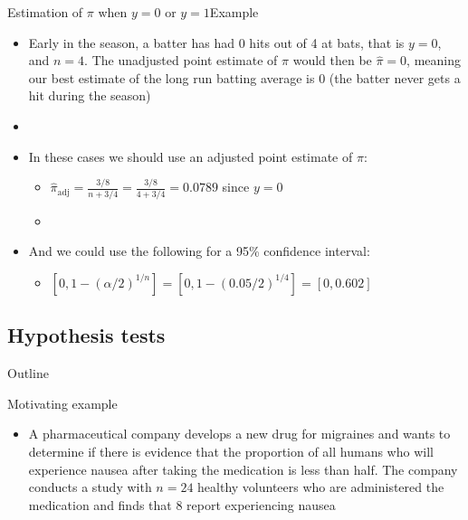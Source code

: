 \documentclass[xcolor=dvipsnames]{beamer}
\begin{document}
\begin{frame}{Estimation of $\pi$ when $y = 0$ or $y = 1$}{Example}
	\begin{itemize}
		\item Early in the season, a batter has had 0 hits out of 4 at bats, that is $y = 0$, and $n = 4$. The unadjusted point estimate of $\pi$ would then be $\hat{\pi} = 0$, meaning our best estimate of the long run batting average is 0 (the batter never gets a hit during the season)  \pause
		\item[]
		\item In these cases we should use an adjusted point estimate of $\pi$:  \pause
		\begin{itemize}
			\item $\hat{\pi}_{\text{adj}}= \frac{3/8}{n + 3/4} = \frac{3/8}{4 + 3/4} = 0.0789$ since $y = 0$  \pause
			\item[]
		\end{itemize}
		
		\item And we could use the following for a 95\% confidence interval:  \pause
		\begin{itemize}
			\item $\left[0, 1 - (\alpha / 2)^{1/n}\right] = \left[0, 1 - (0.05 / 2)^{1/4}\right] = [0, 0.602]$ 
		\end{itemize}
	\end{itemize}
\end{frame}

\subsection{Hypothesis tests}

\begin{frame}{Outline}
	\tableofcontents[currentsection,subsectionstyle=show/shaded/hide]
\end{frame}

\begin{frame}{Motivating example}
	\begin{itemize}
		\item A pharmaceutical company develops a new drug for migraines and wants to determine if there is evidence that the proportion of all humans who will experience nausea after taking the medication is less than half. The company conducts a study with $n = 24$ healthy volunteers who are administered the medication and finds that 8 report experiencing nausea
	\end{itemize}
\end{frame}
\end{document}
